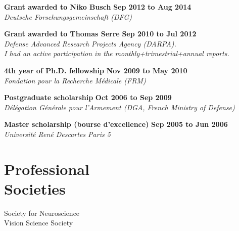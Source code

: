 \documentclass[margin,line]{resume}
\begin{document}
\begin{resume}
	\textbf{Grant awarded to Niko Busch} \hfill \textbf{Sep 2012 to Aug 2014}\\
	\textsl{Deutsche Forschungsgemeinschaft (DFG)}

	\textbf{Grant awarded to Thomas Serre} \hfill \textbf{Sep 2010 to Jul 2012}\\
	\textsl{Defense Advanced Research Projects Agency (DARPA).\\ I had an active participation in the monthly+trimestrial+annual reports.}
	
	\textbf{4th year of Ph.D. fellowship} \hfill \textbf{Nov 2009 to May 2010}\\
	\textsl{Fondation pour la Recherche Médicale (FRM)}

	\textbf{Postgraduate scholarship} \hfill \textbf{Oct 2006 to Sep 2009}\\ %
	\textsl{Délégation Générale pour l'Armement (DGA, French Ministry of Defense)}

	\textbf{Master scholarship (bourse d’excellence)} \hfill \textbf{Sep 2005 to Jun 2006}\\
	\textsl{Université René Descartes Paris 5}


%
%
%

	
	\vspace{3mm}
	\section{\mysidestyle Professional\\Societies}
	Society for Neuroscience\\
	Vision Science Society
	

\end{resume}
\end{document}
